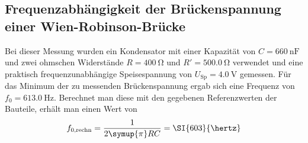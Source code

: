 \subsection{Frequenzabhängigkeit der Brückenspannung einer Wien-Robinson-Brücke} 
Bei dieser Messung wurden ein Kondensator mit einer Kapazität von $C=\SI{660}{\nano\farad}$ und zwei ohmschen Widerstände 
$R=\SI{400}{\ohm}$ und $R'=\SI{500.0}{\ohm}$ verwendet und eine praktisch frequenzunabhängige Speisespannung von
$U_\text{Sp}=\SI{4.0}{\volt}$ gemessen.
Für das Minimum der zu messenden Brückenspannung ergab sich eine Frequenz von $f_0=\SI{613.0}{\hertz}$. 
Berechnet man diese mit den gegebenen Referenzwerten der Bauteile, erhält man einen Wert von 
\begin{equation}
    f_{0\text{,rechn}}=\frac{1}{2 \symup{\pi} RC}=\SI{603}{\hertz} 
\end{equation}
